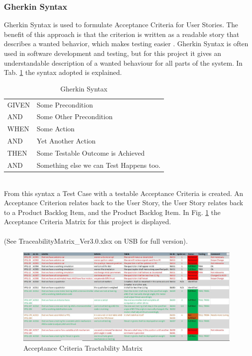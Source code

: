 \subsubsection{Gherkin Syntax}
Gherkin Syntax is used to formulate Acceptance Criteria for User Stories. The benefit of this approach is that the criterion is written as a readable story that describes a wanted behavior, which makes testing easier \cite{ref7}. Gherkin Syntax is often used in software development and testing, but for this project it gives an understandable description of a wanted behaviour for all parts of the system. In Tab. \ref{tab:gherkin} the syntax adopted is explained. 
\begin {table}[h]
    \begin{center}
    \caption {Gherkin Syntax} 
    \label{tab:gherkin} 
    \begin{tabular}{|l|l|}\hline 
\rowcolor{white} GIVEN   &   Some Precondition \\ \rowcolor{gainsboro}
    AND     &   Some Other Precondition        \\
    WHEN    &   Some Action        \\ \rowcolor{gainsboro}
    AND     &   Yet Another Action        \\
    THEN    &   Some Testable Outcome is Achieved       \\ \rowcolor{gainsboro}
    AND    &   Something else we can Test Happens too.   \\
    \hline
    \end{tabular}
    \end{center}
\end{table}
\\
From this syntax a Test Case with a testable Acceptance Criteria is created. An Acceptance Criterion relates back to the User Story, the User Story relates back to a Product Backlog Item, and the Product Backlog Item. In Fig. \ref{fig:ACmatrix} the Acceptance Criteria Matrix for this project is displayed. \\\\(See TraceabilityMatrix\_Ver3.0.xlsx on USB for full version).

\begin{figure}[h]
    \centering
        \includegraphics[width=1\textwidth]{VAPIQ-PICTURES/ACmatrix}
        \caption{Acceptance Criteria Tractability Matrix}
        \label{fig:ACmatrix}
\end{figure}


